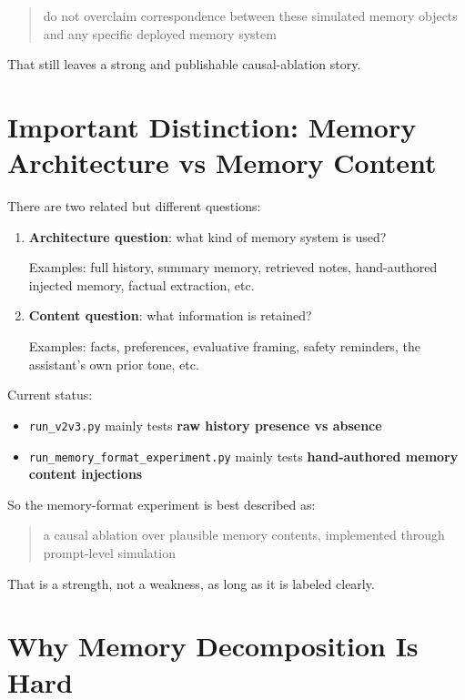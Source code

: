 \documentclass[11pt]{article}
\begin{document}
\begin{quote}
do not overclaim correspondence between these simulated memory objects and any specific deployed memory system
\end{quote}

That still leaves a strong and publishable causal-ablation story.

\section{Important Distinction: Memory Architecture vs Memory Content}

There are two related but different questions:

\begin{enumerate}
  \item \textbf{Architecture question}: what kind of memory system is used?

  Examples: full history, summary memory, retrieved notes, hand-authored injected memory, factual extraction, etc.

  \item \textbf{Content question}: what information is retained?

  Examples: facts, preferences, evaluative framing, safety reminders, the assistant's own prior tone, etc.
\end{enumerate}

Current status:

\begin{itemize}
  \item \texttt{run\_v2v3.py} mainly tests \textbf{raw history presence vs absence}
  \item \texttt{run\_memory\_format\_experiment.py} mainly tests \textbf{hand-authored memory content injections}
\end{itemize}

So the memory-format experiment is best described as:

\begin{quote}
a causal ablation over plausible memory contents, implemented through prompt-level simulation
\end{quote}

That is a strength, not a weakness, as long as it is labeled clearly.

\section{Why Memory Decomposition Is Hard}
\end{document}
